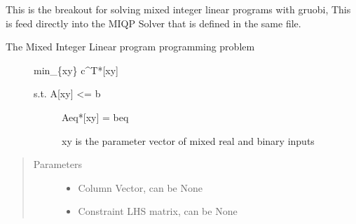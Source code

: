 \documentclass[letterpaper,10pt,english]{sphinxmanual}
\begin{document}
\begin{fulllineitems}
\label{\detokenize{ppopt.solver_interface:ppopt.solver_interface.gurobi_solver_interface.solve_lp_gurobi}}
\sphinxAtStartPar
This is the breakout for solving mixed integer linear programs with gruobi, This is feed directly into the
MIQP Solver that is defined in the same file.
\begin{description}
\item[{The Mixed Integer Linear program programming problem}] \leavevmode
\sphinxAtStartPar
min\_\{xy\} c\textasciicircum{}T*{[}xy{]}
\begin{description}
\item[{s.t.    A{[}xy{]} \textless{}= b}] \leavevmode
\sphinxAtStartPar
Aeq*{[}xy{]} = beq

\sphinxAtStartPar
xy is the parameter vector of mixed real and binary inputs

\end{description}

\end{description}
\begin{quote}\begin{description}
\item[{Parameters}] \leavevmode\begin{itemize}
\item {} 
\sphinxAtStartPar
{} \textendash{} Column Vector, can be None

\item {} 
\sphinxAtStartPar
{} \textendash{} Constraint LHS matrix, can be None


\end{itemize}
\end{description}
\end{quote}
\end{fulllineitems}
\end{document}
